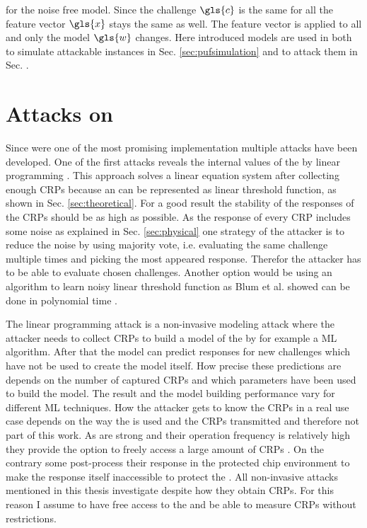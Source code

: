 for the noise free \xpuf model.
Since the challenge $\gls{c}$ is the same for all \apufs the feature vector $\gls{x}$ stays the same as well.
The feature vector is applied to all \apufs and only the \apuf model $\gls{w}$ changes.
Here introduced models are used in both to simulate attackable \apuf instances in Sec. \ref{sec:pufsimulation} and to attack them in Sec. .


\section{Attacks on \apufs}
\label{sec:attacksonarbiter}

Since \apufs were one of the most promising \puf implementation multiple attacks have been developed.
One of the first attacks reveals the internal values of the \apuf by linear programming \cite{Ozturk2008TowardsDevices}.
This approach solves a linear equation system after collecting enough \acp{CRP} because an \apuf can be represented as linear threshold function, as shown in Sec. \ref{sec:theoretical}.
For a good result the stability of the responses of the \acp{CRP} should be as high as possible.
As the response of every \ac{CRP} includes some noise as explained in Sec. \ref{sec:physical} one strategy of the attacker is to reduce the noise by using majority vote, i.e. evaluating the same challenge multiple times and picking the most appeared response.
Therefor the attacker has to be able to evaluate chosen challenges.
Another option would be using an algorithm to learn noisy linear threshold function as Blum et al. showed can be done in polynomial time \cite{Blum1998AlgorithmicaNoisy}.

The linear programming attack is a non-invasive modeling attack where the attacker needs to collect \acp{CRP} to build a model of the \puf by for example a \ac{ML} algorithm.
After that the model can predict responses for new challenges which have not be used to create the model itself.
How precise these predictions are depends on the number of captured \acp{CRP} and which parameters have been used to build the model.
The result and the model building performance vary for different \ac{ML} techniques.
How the attacker gets to know the \acp{CRP} in a real use case depends on the way the \puf is used and the \acp{CRP} transmitted and therefore not part of this work.
As \apufs are strong \pufs and their operation frequency is relatively high they provide the option to freely access a large amount of \acp{CRP} \cite{Ruhrmair2010ModelingFunctions}.
On the contrary some \pufs post-process their response in the protected chip environment to make the \puf response itself inaccessible to protect the \puf \cite{Suh2007PhysicalGeneration, Gassend2004IdentificationCircuits}.
All non-invasive attacks mentioned in this thesis investigate \pufs despite how they obtain \acp{CRP}.
For this reason I assume to have free access to the \puf and be able to measure \acp{CRP} without restrictions.


